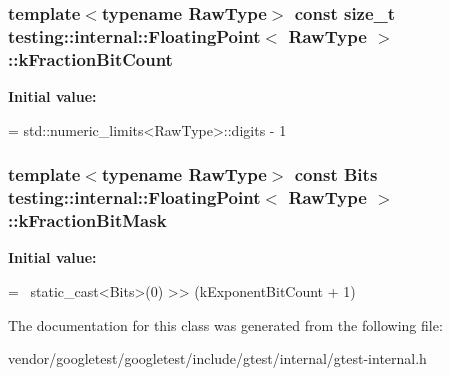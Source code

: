 \subsubsection[{\texorpdfstring{k\+Fraction\+Bit\+Count}{kFractionBitCount}}]{\setlength{\rightskip}{0pt plus 5cm}template$<$typename Raw\+Type$>$ const size\+\_\+t {\bf testing\+::internal\+::\+Floating\+Point}$<$ Raw\+Type $>$\+::k\+Fraction\+Bit\+Count\hspace{0.3cm}{\ttfamily [static]}}\hypertarget{classtesting_1_1internal_1_1FloatingPoint_a0b756a6d2a4f5f5b41ca79651c06c043}{}\label{classtesting_1_1internal_1_1FloatingPoint_a0b756a6d2a4f5f5b41ca79651c06c043}
{\bfseries Initial value\+:}
\begin{DoxyCode}
=
    std::numeric\_limits<RawType>::digits - 1
\end{DoxyCode}
\subsubsection[{\texorpdfstring{k\+Fraction\+Bit\+Mask}{kFractionBitMask}}]{\setlength{\rightskip}{0pt plus 5cm}template$<$typename Raw\+Type$>$ const Bits {\bf testing\+::internal\+::\+Floating\+Point}$<$ Raw\+Type $>$\+::k\+Fraction\+Bit\+Mask\hspace{0.3cm}{\ttfamily [static]}}\hypertarget{classtesting_1_1internal_1_1FloatingPoint_a0ac75d4ffd24f14bca452abe8a718da1}{}\label{classtesting_1_1internal_1_1FloatingPoint_a0ac75d4ffd24f14bca452abe8a718da1}
{\bfseries Initial value\+:}
\begin{DoxyCode}
=
    ~static\_cast<Bits>(0) >> (kExponentBitCount + 1)
\end{DoxyCode}


The documentation for this class was generated from the following file\+:\begin{DoxyCompactItemize}
\item 
vendor/googletest/googletest/include/gtest/internal/gtest-\/internal.\+h\end{DoxyCompactItemize}
